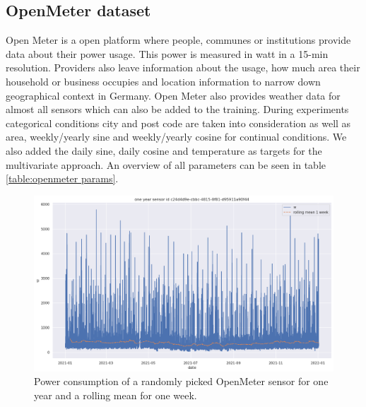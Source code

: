 \subsection*{OpenMeter dataset} 
\label{subsec:openemter}
Open Meter \cite{OMsource} is a open platform where people, communes or institutions provide data about their power usage. This power is measured in watt in a 15-min resolution.
Providers also leave information about the usage, how much area their household or business occupies and location information to narrow down geographical context in Germany.
Open Meter also provides weather data for almost all sensors which can also be added to the training. During experiments categorical conditions city and post code are taken into consideration as well as area, weekly/yearly sine and weekly/yearly cosine for continual conditions. We also added the daily sine, daily cosine and temperature as targets for the multivariate approach.
An overview of all parameters can be seen in table \ref{table:openmeter params}.\newline
\begin{figure}[!h]
    \centering
    \includegraphics[width = \textwidth]{images/one_year_rolling_mean_om.png}
    \caption{Power consumption of a randomly picked OpenMeter sensor for one year and a rolling mean for one week.}
    \label{fig:one_year_lsm}
\end{figure}
